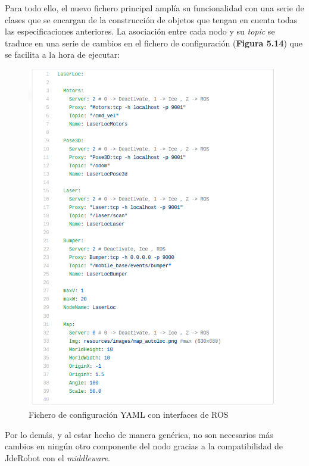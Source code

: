 Para todo ello, el nuevo fichero principal amplía su funcionalidad con una serie de clases que se encargan de la construcción de objetos que tengan en cuenta todas las especificaciones anteriores.
La asociación entre cada nodo y su \textit{topic} se traduce en una serie de cambios en el fichero de configuración (\textbf{Figura 5.14}) que se facilita a la hora de ejecutar:

\begin{figure}[H]
	\begin{center}
		\includegraphics[width=0.98\textwidth]{figures/llymlfinal.png}
		\caption{Fichero de configuración YAML con interfaces de ROS}
		\label{fig.llymlfinal}
		\end{center}
\end{figure}

Por lo demás, y al estar hecho de manera genérica, no son necesarios más cambios en ningún otro componente del nodo gracias a la compatibilidad de JdeRobot con el \textit{middleware}.

